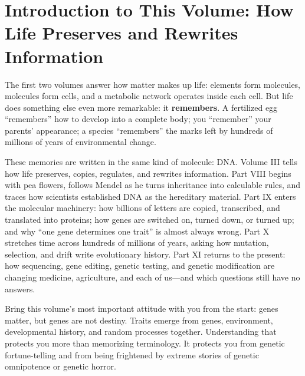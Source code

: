 \chapter*{Introduction to This Volume: How Life Preserves and Rewrites Information}

The first two volumes answer how matter makes up life: elements form molecules, molecules form cells, and a metabolic network operates inside each cell. But life does something else even more remarkable: it \textbf{remembers}. A fertilized egg ``remembers'' how to develop into a complete body; you ``remember'' your parents' appearance; a species ``remembers'' the marks left by hundreds of millions of years of environmental change.

These memories are written in the same kind of molecule: DNA. Volume III tells how life preserves, copies, regulates, and rewrites information. Part VIII begins with pea flowers, follows Mendel as he turns inheritance into calculable rules, and traces how scientists established DNA as the hereditary material. Part IX enters the molecular machinery: how billions of letters are copied, transcribed, and translated into proteins; how genes are switched on, turned down, or turned up; and why ``one gene determines one trait'' is almost always wrong. Part X stretches time across hundreds of millions of years, asking how mutation, selection, and drift write evolutionary history. Part XI returns to the present: how sequencing, gene editing, genetic testing, and genetic modification are changing medicine, agriculture, and each of us---and which questions still have no answers.

Bring this volume's most important attitude with you from the start: genes matter, but genes are not destiny. Traits emerge from genes, environment, developmental history, and random processes together. Understanding that protects you more than memorizing terminology. It protects you from genetic fortune-telling and from being frightened by extreme stories of genetic omnipotence or genetic horror.
